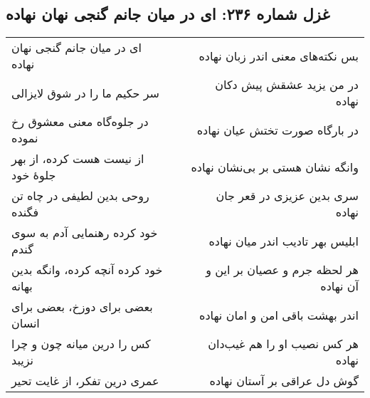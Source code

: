 \begin{center}
\section*{غزل شماره ۲۳۶: ای در میان جانم گنجی نهان نهاده}
\label{sec:236}
\begin{longtable}{l p{0.5cm} r}
ای در میان جانم گنجی نهان نهاده
&&
بس نکته‌های معنی اندر زبان نهاده
\\
سر حکیم ما را در شوق لایزالی
&&
در من یزید عشقش پیش دکان نهاده
\\
در جلوه‌گاه معنی معشوق رخ نموده
&&
در بارگاه صورت تختش عیان نهاده
\\
از نیست هست کرده، از بهر جلوهٔ خود
&&
وانگه نشان هستی بر بی‌نشان نهاده
\\
روحی بدین لطیفی در چاه تن فگنده
&&
سری بدین عزیزی در قعر جان نهاده
\\
خود کرده رهنمایی آدم به سوی گندم
&&
ابلیس بهر تادیب اندر میان نهاده
\\
خود کرده آنچه کرده، وانگه بدین بهانه
&&
هر لحظه جرم و عصیان بر این و آن نهاده
\\
بعضی برای دوزخ، بعضی برای انسان
&&
اندر بهشت باقی امن و امان نهاده
\\
کس را درین میانه چون و چرا نزیبد
&&
هر کس نصیب او را هم غیب‌دان نهاده
\\
عمری درین تفکر، از غایت تحیر
&&
گوش دل عراقی بر آستان نهاده
\\
\end{longtable}
\end{center}
